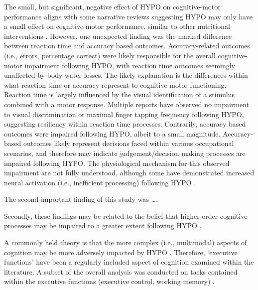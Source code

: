 The small, but significant, negative effect of HYPO on cognitive-motor performance aligns with some narrative reviews suggesting HYPO may only have a small effect on cognitive-motor performance, similar to other nutritional interventions \cite{masento_effects_2014}. However, one unexpected finding was the marked difference between reaction time and accuracy based outcomes. Accuracy-related outcomes (i.e., errors, percentage correct) were likely responsible for the overall cognitive-motor impairment following HYPO, with reaction time outcomes seemingly unaffected by body water losses. The likely explanation is the differences within what reaction time or accuracy represent to cognitive-motor functioning. Reaction time is largely influenced by the visual identification of a stimulus combined with a motor response. Multiple reports have observed no impairment to visual discrimination \cite{grego_influence_2005, van_den_heuvel_independent_2017} or maximal finger tapping frequency \cite{bandelow_effects_2010} following HYPO, suggesting resiliency within reaction time processes. Contrarily, accuracy based outcomes were impaired following HYPO, albeit to a small magnitude. Accuracy-based outcomes likely represent decisions faced within various occupational scenarios, and therefore may indicate judgement/decision making processes are impaired following HYPO. The physiological mechanism for this observed impairment are not fully understood, although some have demonstrated increased neural activation (i.e., inefficient processing) following HYPO \cite{kempton_dehydration_2011,watson_mild_2015}. 

The second important finding of this study was ….

Secondly, these findings may be related to the belief that higher-order cognitive processes may be impaired to a greater extent following HYPO \cite{tomporowski_effects_2007}.

A commonly held theory is that the more complex (i.e., multimodal) aspects of cognition may be more adversely impacted by HYPO \cite{tomporowski_effects_2007}. Therefore, `executive functions' have been a regularly included aspect of cognition examined within the literature. A subset of the overall analysis was conducted on tasks contained within the executive functions (executive control, working memory) \cite{shields_does_2015}.


